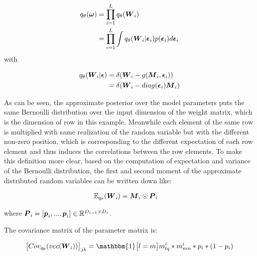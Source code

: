 \begin{equation}
\begin{aligned} \label{appro_dist_form}
q_{\theta}(\boldsymbol \omega) &= \prod_{i=1}^{L} q_{\theta}(\boldsymbol W_{i})\\
&= \prod_{i=1}^{L}\int q_{\theta}(\boldsymbol W_{i} | \boldsymbol \epsilon_{i})p(\boldsymbol \epsilon_{i}) d\boldsymbol \epsilon_{i} 
\end{aligned}
\end{equation}
with

\begin{equation}
\begin{aligned} \label{appro_cond_dist_form}
q_{\theta}(\boldsymbol W_{i}|\boldsymbol \epsilon) &= \delta(\boldsymbol W_{i} - g(\boldsymbol M_{i}, \boldsymbol \epsilon_{i}))  \\
& = \delta(\boldsymbol W_{i} - diag(\boldsymbol \epsilon_{i})\boldsymbol M_{i})
\end{aligned}
\end{equation}

As can be seen, the approximate posterior over the model parameters puts the same Bernoulli distribution over the input dimension of the weight matrix, which is the dimension of row in this example. Meanwhile each element of the same row is multiplied with same realization of the random variable but with the different non-zero position, which is corresponding to the different expectation of each row element and thus induces the correlations between the row elements. To make this definition more clear, based on the computation of expectation and variance of the Bernoulli distribution, the first and second moment of the approximate distributed random variables can be written down like:

\begin{equation}
\begin{aligned} \label{appr_expectation}
\mathbb E_{q_{\theta}}(\boldsymbol W_{i}) & = \boldsymbol M_{i} \odot \boldsymbol P_{i}
\end{aligned}
\end{equation}

where $\boldsymbol P_{i} = [\boldsymbol p_{i}, ..., \boldsymbol p_{i}] \in \mathbb R^{D_{i-1} \times D_{i}}$.

The covariance matrix of the parameter matrix is:

\begin{equation}
\begin{aligned} \label{appr_covariance}
\big[Cov_{q_{\theta}}(vec(\bld W_{i}))\big]_{jk}   = \mathbbm{1} \big[l=m\big] m^{i}_{lq}*m^{i}_{mn}*p_{i}*(1-p_{i})
\end{aligned}
\end{equation}

